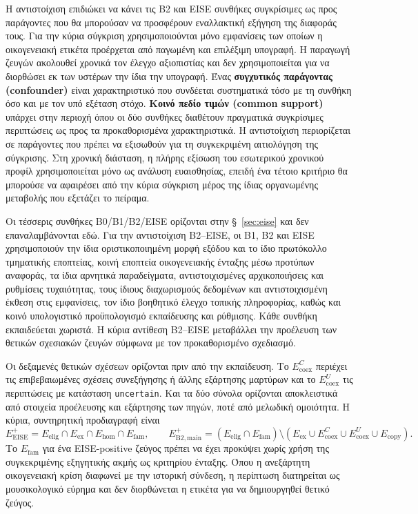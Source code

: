 \documentclass[11pt,a4paper]{article}
\begin{document}
Η αντιστοίχιση επιδιώκει να κάνει τις B2 και EISE συνθήκες συγκρίσιμες ως προς παράγοντες που θα μπορούσαν να προσφέρουν εναλλακτική εξήγηση της διαφοράς τους. Για την κύρια σύγκριση χρησιμοποιούνται μόνο εμφανίσεις των οποίων η οικογενειακή ετικέτα προέρχεται από παγωμένη και επιλέξιμη υπογραφή. Η παραγωγή ζευγών ακολουθεί χρονικά τον έλεγχο αξιοπιστίας και δεν χρησιμοποιείται για να διορθώσει εκ των υστέρων την ίδια την υπογραφή. Ένας \textbf{συγχυτικός παράγοντας (confounder)} είναι χαρακτηριστικό που συνδέεται συστηματικά τόσο με τη συνθήκη όσο και με τον υπό εξέταση στόχο. \textbf{Κοινό πεδίο τιμών (common support)} υπάρχει στην περιοχή όπου οι δύο συνθήκες διαθέτουν πραγματικά συγκρίσιμες περιπτώσεις ως προς τα προκαθορισμένα χαρακτηριστικά. Η αντιστοίχιση περιορίζεται σε παράγοντες που πρέπει να εξισωθούν για τη συγκεκριμένη αιτιολόγηση της σύγκρισης. Στη χρονική διάσταση, η πλήρης εξίσωση του εσωτερικού χρονικού προφίλ χρησιμοποιείται μόνο ως ανάλυση ευαισθησίας, επειδή ένα τέτοιο κριτήριο θα μπορούσε να αφαιρέσει από την κύρια σύγκριση μέρος της ίδιας οργανωμένης μεταβολής που εξετάζει το πείραμα.

Οι τέσσερις συνθήκες B0/B1/B2/EISE ορίζονται στην §~\ref{sec:eise} και δεν επαναλαμβάνονται εδώ. Για την αντιστοίχιση B2--EISE, οι B1, B2 και EISE χρησιμοποιούν την ίδια οριστικοποιημένη μορφή εξόδου και το ίδιο πρωτόκολλο τμηματικής εποπτείας, κοινή εποπτεία οικογενειακής ένταξης μέσω προτύπων αναφοράς, τα ίδια αρνητικά παραδείγματα, αντιστοιχισμένες αρχικοποιήσεις και ρυθμίσεις τυχαιότητας, τους ίδιους διαχωρισμούς δεδομένων και αντιστοιχισμένη έκθεση στις εμφανίσεις, τον ίδιο βοηθητικό έλεγχο τοπικής πληροφορίας, καθώς και κοινό υπολογιστικό προϋπολογισμό εκπαίδευσης και ρύθμισης. Κάθε συνθήκη εκπαιδεύεται χωριστά. Η κύρια αντίθεση B2--EISE μεταβάλλει την προέλευση των θετικών σχεσιακών ζευγών σύμφωνα με τον προκαθορισμένο σχεδιασμό.

Οι δεξαμενές θετικών σχέσεων ορίζονται πριν από την εκπαίδευση. Το $E_{\mathrm{coex}}^{C}$ περιέχει τις επιβεβαιωμένες σχέσεις συνεξήγησης ή άλλης εξάρτησης μαρτύρων και το $E_{\mathrm{coex}}^{U}$ τις περιπτώσεις με κατάσταση \texttt{uncertain}. Και τα δύο σύνολα ορίζονται αποκλειστικά από στοιχεία προέλευσης και εξάρτησης των πηγών, ποτέ από μελωδική ομοιότητα. Η κύρια, συντηρητική προδιαγραφή είναι
\[
E_{\mathrm{EISE}}^+=E_{\mathrm{elig}}\cap E_{\mathrm{ex}}\cap E_{\mathrm{hom}}\cap E_{\mathrm{fam}},
\qquad
E_{\mathrm{B2,main}}^+=(E_{\mathrm{elig}}\cap E_{\mathrm{fam}})\setminus(E_{\mathrm{ex}}\cup E_{\mathrm{coex}}^{C}\cup E_{\mathrm{coex}}^{U}\cup E_{\mathrm{copy}}).
\]
Το $E_{\mathrm{fam}}$ για ένα EISE-positive ζεύγος πρέπει να έχει προκύψει χωρίς χρήση της συγκεκριμένης εξηγητικής ακμής ως κριτηρίου ένταξης. Όπου η ανεξάρτητη οικογενειακή κρίση διαφωνεί με την ιστορική σύνδεση, η περίπτωση διατηρείται ως μουσικολογικό εύρημα και δεν διορθώνεται η ετικέτα για να δημιουργηθεί θετικό ζεύγος.
\end{document}
